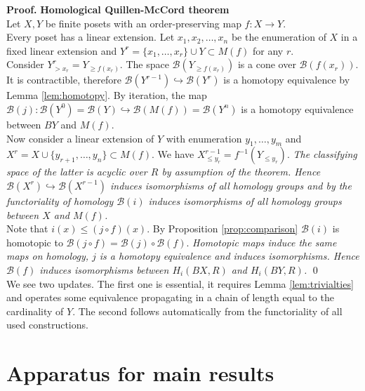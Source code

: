 \documentclass[english,12pt]{article}
\numberwithin{equation}{section}
\theoremstyle{definition}
\theoremstyle{remark}
\newenvironment{pf}{\noindent\textbf{Proof.}}{\qed}
\renewcommand{\leq}{\leqslant}
\renewcommand{\geq}{\geqslant}
\begin{document}
\begin{pf} \textbf{Homological Quillen-McCord theorem}\\
Let $X, Y$ be finite posets with an order-preserving map $f : X \to Y$.\\

Every poset has a linear extension. Let $x_1, x_2, \ldots, x_n$ be the enumeration of $X$ in a fixed linear extension and $Y^r = \{x_1,\ldots,x_r\} \cup Y \subset M(f)$ for any $r$.\\

Consider $Y^r_{>x_r} = Y_{\geq f(x_r)}$. The space $\mathcal{B}(Y_{\geq f(x_r)})$ is a cone over $\mathcal{B}(f(x_r))$. It is contractible, therefore $\mathcal{B}(Y^{r-1}) \hookrightarrow \mathcal{B}(Y^{r})$ is a homotopy equivalence by Lemma \ref{lem:homotopy}. By iteration, the map $\mathcal{B}(j) : \mathcal{B}(Y^{0}) = \mathcal{B}(Y) \hookrightarrow \mathcal{B}(M(f)) = \mathcal{B}(Y^n)$ is a homotopy equivalence between $BY$ and $M(f)$.\\

Now consider a linear extension of $Y$ with enumeration $y_1,\ldots,y_m$ and $X^r = X \cup \{y_{r+1},\ldots,y_n\} \subset M(f)$. We have $X^{r-1}_{\leq y_r} = f^{-1}(Y_{\leqslant y_r})$. \textit{The classifying space of the latter is acyclic over $R$ by assumption of the theorem. Hence $\mathcal{B}(X^{r}) \hookrightarrow \mathcal{B}(X^{r-1})$ induces isomorphisms of all homology groups and by the functoriality of homology $\mathcal{B}(i)$ induces isomorphisms of all homology groups between $X$ and $M(f)$.}\\

Note that $i(x) \leqslant (j \circ f)(x)$. By Proposition \ref{prop:comparison} $\mathcal{B}(i)$ is homotopic to $\mathcal{B}(j \circ f) = \mathcal{B}(j) \circ \mathcal{B}(f)$. \textit{Homotopic maps induce the same maps on homology, $j$ is a homotopy equivalence and induces isomorphisms. Hence $\mathcal{B}(f)$ induces isomorphisms between $H_i(BX,R)$ and $H_i(BY,R)$.}
\end{pf}\\

We see two updates. The first one is essential, it requires Lemma \ref{lem:trivialties} and operates some equivalence propagating in a chain of length equal to the cardinality of $Y$. The second follows automatically from the functoriality of all used constructions.

\section{Apparatus for main results}
\end{document}
